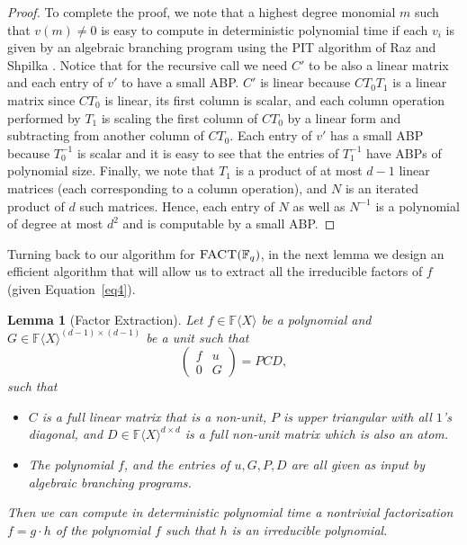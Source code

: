 \documentclass[10pt,a4paper]{article}
\newtheorem{lemma}[theorem]{Lemma}
\newcommand{\F}{\mathbb{F}}
\renewcommand{\angle}[1]{\langle #1 \rangle}
\newcommand{\FX}{\F\angle{X}}
\newcommand{\fR}{\FX}
\newcommand{\prob}[1]{\textsc{#1}}
\begin{document}
\begin{proof}
  To complete the proof, we note that a highest degree monomial $m$
  such that $v(m)\ne 0$ is easy to compute in deterministic polynomial
  time if each $v_i$ is given by an algebraic branching program using
  the PIT algorithm of Raz and Shpilka \cite{RS05}. Notice that for
  the recursive call we need $C'$ to be also a linear matrix and each
  entry of $v'$ to have a small ABP. $C'$ is linear because $CT_0T_1$
  is a linear matrix since $CT_0$ is linear, its first column is
  scalar, and each column operation performed by $T_1$ is scaling the
  first column of $CT_0$ by a linear form and subtracting from another
  column of $CT_0$. Each entry of $v'$ has a small ABP because
  $T_0^{-1}$ is scalar and it is easy to see that the entries of
  $T_1^{-1}$ have ABPs of polynomial size. Finally, we note that $T_1$
  is a product of at most $d-1$ linear matrices (each corresponding to
  a column operation), and $N$ is an iterated product of $d$ such
  matrices. Hence, each entry of $N$ as well as $N^{-1}$ is a
  polynomial of degree at most $d^2$ and is computable by a small ABP.


  
\end{proof}

%
%
%
%

Turning back to our algorithm for $\prob{FACT}(\F_q)$, in the next
lemma we design an efficient algorithm that will allow us to extract
all the irreducible factors of $f$ (given Equation~\ref{eq4}).

\begin{lemma}[Factor Extraction]\label{extract}
  Let $f\in\fR$ be a polynomial and $G\in\fR^{(d-1)\times (d-1)}$ be a
  unit such that
  \begin{equation}\label{eq5}
  \left(
\begin{array}{cc}
f & u \\
0 & G
\end{array}
\right)
= P CD,
\end{equation}
such that
\begin{itemize}
\item $C$ is a full linear matrix that is a non-unit, $P$ is upper
  triangular with all $1$'s diagonal, and $D\in\fR^{d\times d}$ is a
  full non-unit matrix which is also an atom.
\item The polynomial $f$, and the entries of $u, G, P, D$ are all
  given as input by algebraic branching programs.
\end{itemize}
Then we can compute in deterministic polynomial time a nontrivial
factorization $f=g\cdot h$ of the polynomial $f$ such that $h$ is an
irreducible polynomial.
\end{lemma}
\end{document}
